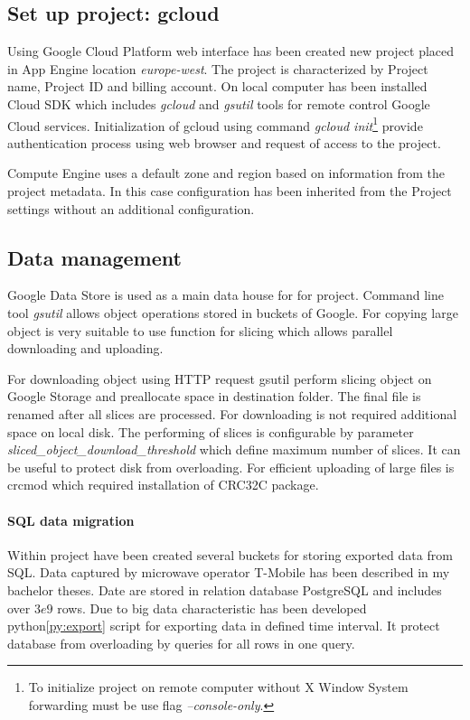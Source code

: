 \documentclass[a4paper,12pt,oneside]{report}
\begin{document}
		\subsection{Set up project: gcloud}
Using Google Cloud Platform web interface has been created new project placed in App Engine 
location \textit{europe-west}. The project is characterized by Project name, Project ID and billing account.
On local computer has been installed Cloud SDK which includes \textit{gcloud} 
and \textit{gsutil} tools for remote control Google Cloud services.
Initialization of gcloud using command \emph{gcloud init}\footnote{To initialize project on remote computer without X Window System forwarding must be use flag \emph{--console-only}.} provide authentication process using web browser 
and request of access to the project.

Compute Engine uses a default zone and region based on information from the project metadata. In this case configuration has been inherited from the Project settings without an additional configuration.


\subsection{Data management}
        Google Data Store is used as a main data house for for project. Command line tool \textit{gsutil} allows object operations stored in buckets of Google. For copying large object is very suitable to use function for slicing which allows parallel downloading and uploading.
        
For downloading object using HTTP request gsutil perform slicing object on Google Storage  and preallocate space in destination folder. The final file is renamed after all slices are processed. For downloading is not required additional space on local disk. The performing of slices is configurable by parameter \textit{sliced\_object\_download\_threshold} which define maximum number of slices. It can be useful to protect disk from overloading. For efficient uploading of large files is crcmod which required installation  of CRC32C package. 

\paragraph{SQL data migration} Within project have been created several buckets for storing exported data from SQL. Data captured by microwave operator T-Mobile has been described in my bachelor theses\cite{bp_krejci}. Date are stored in relation database PostgreSQL and includes over $3e9$ rows. Due to big data characteristic has been developed python\ref{py:export} script for exporting data in defined time interval. It protect database from overloading by queries for all rows in one query. 
\end{document}
